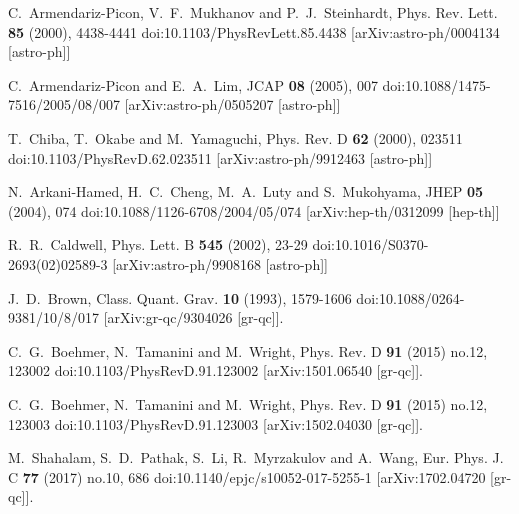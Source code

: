 \documentclass[a4paper,12pt]{article}
\begin{document}
\begin{thebibliography}{99}
C.~Armendariz-Picon, V.~F.~Mukhanov and P.~J.~Steinhardt,
Phys. Rev. Lett. \textbf{85} (2000), 4438-4441
doi:10.1103/PhysRevLett.85.4438
[arXiv:astro-ph/0004134 [astro-ph]]
		
C.~Armendariz-Picon and E.~A.~Lim,
JCAP \textbf{08} (2005), 007
doi:10.1088/1475-7516/2005/08/007
[arXiv:astro-ph/0505207 [astro-ph]]
		
T.~Chiba, T.~Okabe and M.~Yamaguchi,
Phys. Rev. D \textbf{62} (2000), 023511
doi:10.1103/PhysRevD.62.023511
[arXiv:astro-ph/9912463 [astro-ph]]
		
N.~Arkani-Hamed, H.~C.~Cheng, M.~A.~Luty and S.~Mukohyama,
JHEP \textbf{05} (2004), 074
doi:10.1088/1126-6708/2004/05/074
[arXiv:hep-th/0312099 [hep-th]]
		
R.~R.~Caldwell,
Phys. Lett. B \textbf{545} (2002), 23-29
doi:10.1016/S0370-2693(02)02589-3
[arXiv:astro-ph/9908168 [astro-ph]]
		
		
J.~D.~Brown,
Class. Quant. Grav. \textbf{10} (1993), 1579-1606
doi:10.1088/0264-9381/10/8/017
[arXiv:gr-qc/9304026 [gr-qc]].
		
C.~G.~Boehmer, N.~Tamanini and M.~Wright,
Phys. Rev. D \textbf{91} (2015) no.12, 123002
doi:10.1103/PhysRevD.91.123002
[arXiv:1501.06540 [gr-qc]].
		
C.~G.~Boehmer, N.~Tamanini and M.~Wright,
Phys. Rev. D \textbf{91} (2015) no.12, 123003
doi:10.1103/PhysRevD.91.123003
[arXiv:1502.04030 [gr-qc]].
		
		
M.~Shahalam, S.~D.~Pathak, S.~Li, R.~Myrzakulov and A.~Wang,
Eur. Phys. J. C \textbf{77} (2017) no.10, 686
doi:10.1140/epjc/s10052-017-5255-1
[arXiv:1702.04720 [gr-qc]].
		

\end{thebibliography}
\end{document}
